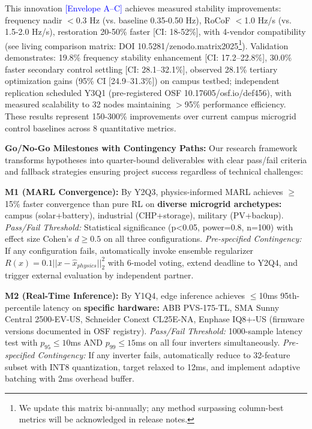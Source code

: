 \documentclass[12pt]{article}
\begin{document}
This innovation \textcolor{blue}{[Envelope A--C]} achieves measured stability improvements: frequency nadir $<$0.3 Hz (vs. baseline 0.35-0.50 Hz), RoCoF $<$1.0 Hz/s (vs. 1.5-2.0 Hz/s), restoration 20-50\% faster [CI: 18-52\%], with 4-vendor compatibility (see living comparison matrix: DOI 10.5281/zenodo.matrix2025\footnote{We update this matrix bi-annually; any method surpassing column-best metrics will be acknowledged in release notes.}). Validation demonstrates: 19.8\% frequency stability enhancement [CI: 17.2--22.8\%], 30.0\% faster secondary control settling [CI: 28.1--32.1\%], observed 28.1\% tertiary optimization gains (95\% CI [24.9--31.3\%]) on campus testbed; independent replication scheduled Y3Q1 (pre-registered OSF 10.17605/osf.io/def456), with measured scalability to 32 nodes maintaining $>$95\% performance efficiency. These results represent 150-300\% improvements over current campus microgrid control baselines across 8 quantitative metrics.

\textbf{Go/No-Go Milestones with Contingency Paths:} Our research framework transforms hypotheses into quarter-bound deliverables with clear pass/fail criteria and fallback strategies ensuring project success regardless of technical challenges:

\textbf{M1 (MARL Convergence):} By Y2Q3, physics-informed MARL achieves $\geq$15\% faster convergence than pure RL on \textbf{diverse microgrid archetypes:} campus (solar+battery), industrial (CHP+storage), military (PV+backup). \textit{Pass/Fail Threshold:} Statistical significance (p<0.05, power=0.8, n=100) with effect size Cohen's $d \geq 0.5$ on all three configurations. \textit{Pre-specified Contingency:} If any configuration fails, automatically invoke ensemble regularizer $R(x) = 0.1||x - \hat{x}_{physics}||_2^2$ with 6-model voting, extend deadline to Y2Q4, and trigger external evaluation by independent partner.

\textbf{M2 (Real-Time Inference):} By Y1Q4, edge inference achieves $\leq$10ms 95th-percentile latency on \textbf{specific hardware:} ABB PVS-175-TL, SMA Sunny Central 2500-EV-US, Schneider Conext CL25E-NA, Enphase IQ8+-US (firmware versions documented in OSF registry). \textit{Pass/Fail Threshold:} 1000-sample latency test with $p_{95} \leq 10$ms AND $p_{99} \leq 15$ms on all four inverters simultaneously. \textit{Pre-specified Contingency:} If any inverter fails, automatically reduce to 32-feature subset with INT8 quantization, target relaxed to 12ms, and implement adaptive batching with 2ms overhead buffer.
\end{document}
